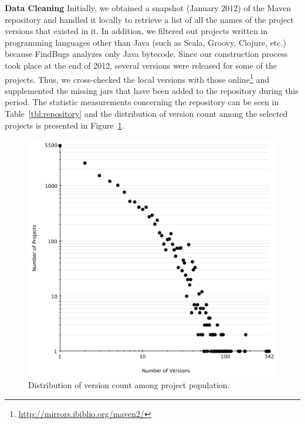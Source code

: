 \documentclass{sig-alternate}
\begin{document}
{\bf Data Cleaning} Initially, we obtained a snapshot
(January 2012) of the Maven repository and handled it
locally to retrieve a list
of all the names of the project versions that existed in
it. In addition, we filtered out projects written in programming
languages other than Java (such as Scala, Groovy, Clojure, etc.)
because FindBugs analyzes only Java bytecode.
Since our construction process took place at the end of 2012,
several versions were released for some of the projects.
Thus, we cross-checked
the local versions with those online\footnote{\url{http://mirrors.ibiblio.org/maven2/}}
and supplemented the missing {\sc jar}s that have been
added to the repository during this period.
The statistic measurements concerning
the repository can be seen in Table~\ref{tbl:repository}
and the distribution of version
count among the selected projects is
presented in Figure~\ref{fig:version-count}.

\begin{figure}[t]
	\centering
	\includegraphics[scale=0.37]{version_count.pdf}
	\caption{Distribution of version count among project population.}
	\label{fig:version-count}
\end{figure}


\end{document}
